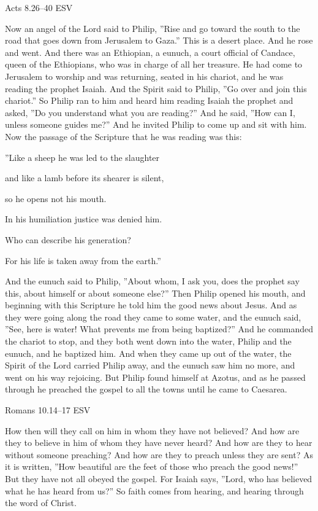 \documentclass[
]{article}
\newcommand{\RL}[1]{\beginR #1\endR}
\begin{document}
Acts 8.26--40 ESV

Now an angel of the Lord said to Philip, \RL{''}Rise and go toward the
south to the road that goes down from Jerusalem to Gaza.'' This is a
desert place. And he rose and went. And there was an Ethiopian, a
eunuch, a court official of Candace, queen of the Ethiopians, who was in
charge of all her treasure. He had come to Jerusalem to worship and was
returning, seated in his chariot, and he was reading the prophet Isaiah.
And the Spirit said to Philip, \RL{''}Go over and join this chariot.''
So Philip ran to him and heard him reading Isaiah the prophet and asked,
\RL{''}Do you understand what you are reading?'' And he said, \RL{''}How
can I, unless someone guides me?'' And he invited Philip to come up and
sit with him. Now the passage of the Scripture that he was reading was
this:

\RL{''}Like a sheep he was led to the slaughter

and like a lamb before its shearer is silent,

so he opens not his mouth.

In his humiliation justice was denied him.

Who can describe his generation?

For his life is taken away from the earth.''

And the eunuch said to Philip, \RL{''}About whom, I ask you, does the
prophet say this, about himself or about someone else?'' Then Philip
opened his mouth, and beginning with this Scripture he told him the good
news about Jesus. And as they were going along the road they came to
some water, and the eunuch said, \RL{''}See, here is water! What
prevents me from being baptized?'' And he commanded the chariot to stop,
and they both went down into the water, Philip and the eunuch, and he
baptized him. And when they came up out of the water, the Spirit of the
Lord carried Philip away, and the eunuch saw him no more, and went on
his way rejoicing. But Philip found himself at Azotus, and as he passed
through he preached the gospel to all the towns until he came to
Caesarea.

Romans 10.14--17 ESV

How then will they call on him in whom they have not believed? And how
are they to believe in him of whom they have never heard? And how are
they to hear without someone preaching? And how are they to preach
unless they are sent? As it is written, \RL{''}How beautiful are the
feet of those who preach the good news!'' But they have not all obeyed
the gospel. For Isaiah says, \RL{''}Lord, who has believed what he has
heard from us?'' So faith comes from hearing, and hearing through the
word of Christ.
\end{document}
